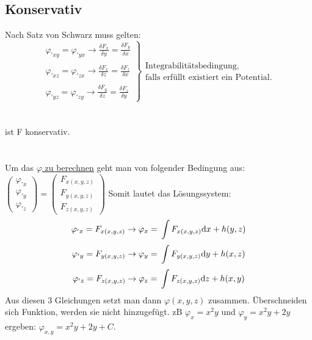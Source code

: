 \subsection{Konservativ}
Nach Satz von Schwarz muss gelten:\\
\[
\left.\begin{array}{l}
	\varphi_{'xy}=	\varphi_{'yx} \rightarrow \frac{\delta  F_x}{\delta y}=\frac{\delta  F_y}{\delta x} 
	\\ \\
	\varphi_{'xz}=	\varphi_{'zx} \rightarrow \frac{\delta  F_x}{\delta z}=\frac{\delta  F_z}{\delta x}
	\\ \\
	\varphi_{'yz}=	\varphi_{'zy} \rightarrow \frac{\delta  F_y}{\delta z}=\frac{\delta  F_z}{\delta y}
\end{array} \right\}
\begin{array}{l}
	\text{Integrabilitätsbedingung,}\\
	\text{falls erfüllt existiert ein Potential.}
\end{array}
\]
\\
\\
ist F konservativ.\\
\\
\\
Um das \underline{$\varphi$ zu berechnen} geht man von folgender Bedingung aus:\\
$	\begin{pmatrix}
	 	\varphi_{'x}\\
		\varphi_{'y}\\
		\varphi_{'z}
	\end{pmatrix} 
	=														\begin{pmatrix}
		F_{x(x,y,z)}\\										F_{y(x,y,z)}\\
		F_{z(x,y,z)}								
	\end{pmatrix} 
$
Somit lautet das Lösungssystem:
\[	
		\varphi_{'x} \\=\\ 	F_{x(x,y,z)} \\ \rightarrow \\ \varphi_{x} \\=\\ 	\int F_{x(x,y,z)}\mathrm{d} x +h(y,z)
\]
\[	
		\varphi_{'y} \\=\\  F_{y(x,y,z)} \\ \rightarrow \\
		\varphi_{y} \\=\\  \int F_{y(x,y,z)} \mathrm{d} y +h(x,z)
\]
\[
		\varphi_{'z} \\=\\  F_{z(x,y,z)} \\ \rightarrow \\
		\varphi_{z} \\=\\  \int F_{z(x,y,z)} \mathrm{d} z +h(x,y)
\]
Aus diesen 3 Gleichungen setzt man dann $\varphi(x,y,z)$ zusammen. Überschneiden sich Funktion, werden sie nicht hinzugefügt. zB $\varphi_{x}=x^2y$ und $\varphi_{y}=x^2y +2y$ ergeben: $\varphi_{x,y}=x^2y +2y+C$.



